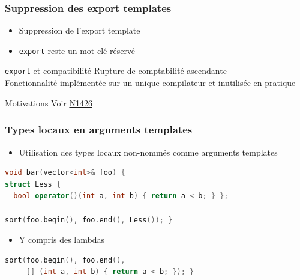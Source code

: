 \documentclass[C++.tex]{subfiles}
\begin{document}
\begin{frame}[fragile]
	\frametitle{Suppression des export templates}
	\begin{itemize}
		\item Suppression de l'export template
		\item \lstinline|export| reste un mot-clé réservé
	\end{itemize}

	\begin{block}{\lstinline|export| et compatibilité}
		Rupture de comptabilité ascendante\\
		Fonctionnalité implémentée sur un unique compilateur et inutilisée en pratique

	\end{block}

	\begin{block}{Motivations}
		Voir \href{http://www.open-std.org/jtc1/sc22/wg21/docs/papers/2003/n1426.pdf}{N1426}

	\end{block}
\end{frame}

\begin{frame}[fragile]
	\frametitle{Types locaux en arguments templates}
	\begin{itemize}
		\item Utilisation des types locaux non-nommés comme arguments templates
	\end{itemize}

	\begin{lstlisting}[language=C++]
void bar(vector<int>& foo) {
struct Less {
  bool operator()(int a, int b) { return a < b; } };

sort(foo.begin(), foo.end(), Less()); }\end{lstlisting}

	\begin{itemize}
		\item Y compris des lambdas
	\end{itemize}

	\begin{lstlisting}[language=C++]
sort(foo.begin(), foo.end(),
     [] (int a, int b) { return a < b; }); }\end{lstlisting}
\end{frame}
\end{document}
